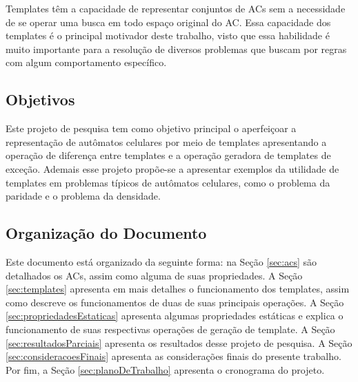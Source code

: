 Templates têm a capacidade de representar conjuntos de ACs sem a necessidade de se operar uma busca em todo espaço original do AC. Essa capacidade dos templates é o principal motivador deste trabalho, visto que essa habilidade é muito importante para a resolução de diversos problemas que buscam por regras com algum comportamento específico.

\subsection{Objetivos}
Este projeto de pesquisa tem como objetivo principal o aperfeiçoar a representação de autômatos celulares por meio de templates apresentando a operação de diferença entre templates e a operação geradora de templates de exceção. Ademais esse projeto propõe-se a apresentar exemplos da utilidade de templates em problemas típicos de autômatos celulares, como o problema da paridade e o problema da densidade.

\subsection{Organização do Documento}
Este documento está organizado da seguinte forma: na Seção \ref{sec:acs} são detalhados os ACs, assim como alguma de suas propriedades. A Seção \ref{sec:templates} apresenta em mais detalhes o funcionamento dos templates, assim como descreve os funcionamentos de duas de suas principais operações. A Seção \ref{sec:propriedadesEstaticas} apresenta algumas propriedades estáticas e explica o funcionamento de suas respectivas operações de geração de template. A Seção \ref{sec:resultadosParciais} apresenta os resultados desse projeto de pesquisa. A Seção \ref{sec:consideracoesFinais} apresenta as considerações finais do presente trabalho. Por fim, a Seção \ref{sec:planoDeTrabalho} apresenta o cronograma do projeto.